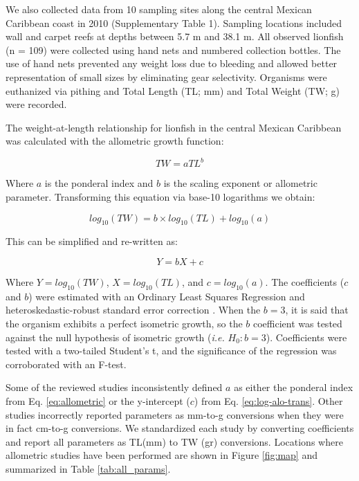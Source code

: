 \documentclass[smallextended]{svjour3}       %
\begin{document}
We also collected data from 10 sampling sites along the central Mexican
Caribbean coast in 2010 (Supplementary Table 1). Sampling locations
included wall and carpet reefs at depths between 5.7 m and 38.1 m. All
observed lionfish (n = 109) were collected using hand nets and numbered
collection bottles. The use of hand nets prevented any weight loss due
to bleeding and allowed better representation of small sizes by
eliminating gear selectivity. Organisms were euthanized via pithing and
Total Length (TL; mm) and Total Weight (TW; g) were recorded.

The weight-at-length relationship for lionfish in the central Mexican
Caribbean was calculated with the allometric growth function:

\begin{equation}
\label{eq:allometric}
TW = aTL^b
\end{equation}

Where \(a\) is the ponderal index and \(b\) is the scaling exponent or
allometric parameter. Transforming this equation via base-10 logarithms
we obtain:

\begin{equation}
\label{eq:log-alo}
log_{10}(TW) = b\times log_{10}(TL) + log_{10}(a)
\end{equation}

This can be simplified and re-written as:

\begin{equation}
\label{eq:log-alo-trans}
Y = bX + c
\end{equation}

Where \(Y = log_{10}(TW)\), \(X = log_{10}(TL)\), and
\(c = log_{10}(a)\). The coefficients (\(c\) and \(b\)) were estimated
with an Ordinary Least Squares Regression and heteroskedastic-robust
standard error correction \citep{zeileis_2004}. When the \(b = 3\), it
is said that the organism exhibits a perfect isometric growth, so the
\(b\) coefficient was tested against the null hypothesis of isometric
growth (\emph{i.e.} \(H_0: b = 3\)). Coefficients were tested with a
two-tailed Student's t, and the significance of the regression was
corroborated with an F-test.

Some of the reviewed studies inconsistently defined \(a\) as either the
ponderal index from Eq. \ref{eq:allometric} or the y-intercept (\(c\))
from Eq. \ref{eq:log-alo-trans}. Other studies incorrectly reported
parameters as mm-to-g conversions when they were in fact cm-to-g
conversions. We standardized each study by converting coefficients and
report all parameters as TL(mm) to TW (gr) conversions. Locations where
allometric studies have been performed are shown in Figure \ref{fig:map}
and summarized in Table \ref{tab:all_params}.
\end{document}
